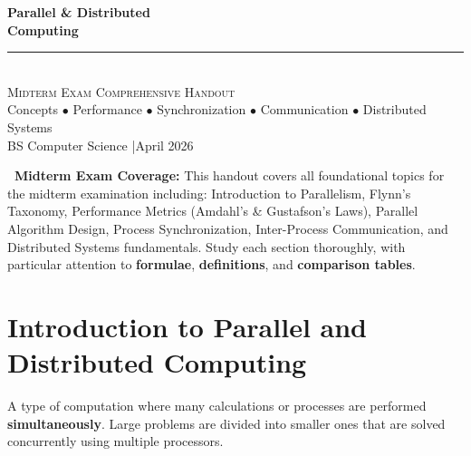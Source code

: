 \documentclass[11pt,a4paper]{article}
\begin{document}
\begin{center}
\vspace*{0.4cm}
{\Huge\bfseries\textcolor{primary}{Parallel \& Distributed}}\\[8pt]
{\Huge\bfseries\textcolor{primary}{Computing}}\\[16pt]
{\color{secondary}\rule{0.65\textwidth}{1.5pt}}\\[14pt]
{\Large\textsc{Midterm Exam Comprehensive Handout}}\\[8pt]
{\large\textcolor{gray!70!black}{Concepts $\bullet$ Performance $\bullet$ Synchronization $\bullet$ Communication $\bullet$ Distributed Systems}}\\[6pt]
{\normalsize\textcolor{primary!70}{BS Computer Science \quad|\quad April 2026}}
\vspace{0.3cm}
\end{center}

\begin{tcolorbox}[
  enhanced, colback=primary!6, colframe=primary,
  boxrule=1pt, arc=4pt, left=10pt, right=10pt, top=6pt, bottom=6pt
]
\textbf{\textcolor{primary}{~Midterm Exam Coverage:}} This handout covers all foundational topics for the midterm examination including: Introduction to Parallelism, Flynn's Taxonomy, Performance Metrics (Amdahl's \& Gustafson's Laws), Parallel Algorithm Design, Process Synchronization, Inter-Process Communication, and Distributed Systems fundamentals. Study each section thoroughly, with particular attention to \textbf{formulae}, \textbf{definitions}, and \textbf{comparison tables}.
\end{tcolorbox}
\vspace{6pt}
\tableofcontents
\newpage

\section{Introduction to Parallel and Distributed Computing}

\begin{definitionbox}
A type of computation where many calculations or processes are performed \textbf{simultaneously}. Large problems are divided into smaller ones that are solved concurrently using multiple processors.
\end{definitionbox}
\end{document}
